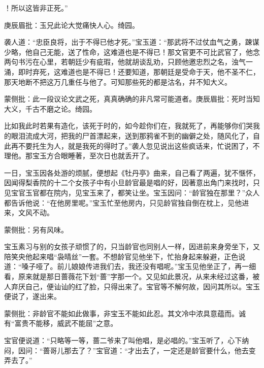 \begin{parag}
！所以这皆非正死。”\begin{note}庚辰眉批：玉兄此论大觉痛快人心。绮园。\end{note}袭人道：“忠臣良将，出于不得已他才死。”宝玉道：“那武将不过仗血气之勇，踈谋少略，他自己无能，送了性命，这难道也是不得已！那文官更不可比武官了，他念两句书污在心里，若朝廷少有疵瑕，他就胡谈乱劝，只顾他邀忠烈之名，浊气一涌，即时弃死，这难道也是不得已！还要知道，那朝廷是受命于天，他不圣不仁，那天地断不把这万几重任与他了。可知那些死的都是沽名，幷不知大义。\begin{note}蒙侧批：此一段议论文武之死，真真确确的非凡常可能道者。庚辰眉批：死时当知大义，千古不磨之论。绮园。\end{note}比如我此时若果有造化，该死于时的，如今趁你们在，我就死了，再能够你们哭我的眼泪流成大河，把我的尸首漂起来，送到那鸦雀不到的幽僻之处，随风化了，自此再不要托生为人，就是我死的得时了。”袭人忽见说出这些疯话来，忙说困了，不理他。那宝玉方合眼睡著，至次日也就丢开了。
\end{parag}


\begin{parag}
    一日，宝玉因各处游的烦腻，便想起《牡丹亭》曲来，自己看了两遍，犹不惬怀，因闻得梨香院的十二个女孩子中有小旦龄官最是唱的好，因著意出角门来找时，只见宝官玉官都在院内，见宝玉来了，都笑让坐。宝玉因问：“龄官独在那里？”众人都告诉他说：“在他房里呢。”宝玉忙至他房内，只见龄官独自倒在枕上，见他进来，文风不动。\begin{note}蒙侧批：另有风味。\end{note}宝玉素习与别的女孩子顽惯了的，只当龄官也同别人一样，因进前来身旁坐下，又陪笑央他起来唱“袅晴丝”一套。不想龄官见他坐下，忙抬身起来躲避，正色说道：“嗓子哑了。前儿娘娘传进我们去，我还没有唱呢。”宝玉见他坐正了，再一细看，原来就是那日蔷薇花下划“蔷”字那一个。又见如此景况，从来未经过这番，被人弃厌自己，便讪讪的红了脸，只得出来了。宝官等不解何故，因问其所以。宝玉便说了，遂出来。\begin{note}蒙侧批：非龄官不能如此做事，非宝玉不能如此忍。其文冷中浓具意蕴而。诚有“富贵不能移，威武不能屈”之意。\end{note}宝官便说道：“只略等一等，蔷二爷来了叫他唱，是必唱的。”宝玉听了，心下纳闷，因问：“蔷哥儿那去了？”宝官道：“才出去了，一定还是龄官要什么，他去变弄去了。”
\end{parag}


